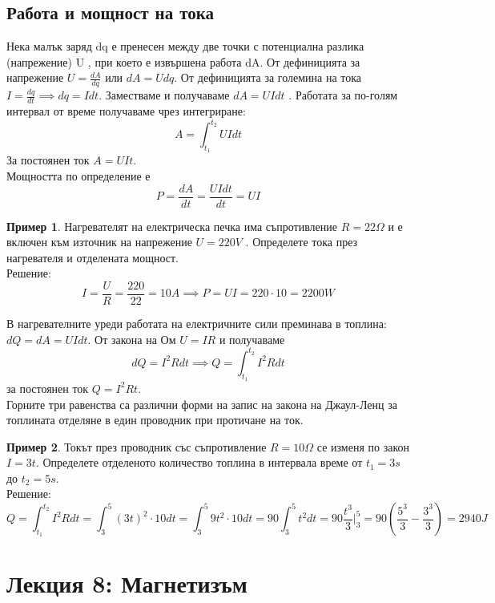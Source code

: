 \documentclass[fleqn, 12pt]{article}
\theoremstyle{definition}
\newtheorem{example}{Пример}[subsection]
\begin{document}
\subsection{Работа и мощност на тока}
Нека малък заряд dq е пренесен между две точки с потенциална разлика
(напрежение) U , при което е извършена работа dA. От дефиницията за
напрежение $U = \frac{dA}{dq}$ или $dA = Udq$. От дефиницията за големина на тока $I = \frac{dq}{dt} \implies dq = Idt$. Заместваме и получаваме $dA= U I dt$ . Работата за по-голям интервал от време
получаваме чрез интегриране:
$$A = \int_{t_1} ^{t_2} U I dt$$
За постоянен ток $A = UIt$. \\
Мощността по определение е
$$P = \frac{dA}{dt} = \frac{U I dt}{dt} = UI$$

\begin{example}
Нагревателят на електрическа печка има съпротивление $R = 22 \Omega$ и е
включен към източник на напрежение $U = 220 V$ . Определете тока през нагревателя
и отделената мощност.\\
Решение: 
$$I = \frac{U}{R} = \frac{220}{22} = 10A \implies P = UI = 220 \cdot 10 = 2200W$$
\end{example}

В нагревателните уреди работата на електричните сили преминава в топлина:
$dQ = dA = U I dt $. От закона на Ом $U = IR$ и получаваме
$$dQ = I^2 R dt \implies Q = \int_{t_1} ^{t_2} I^2 R dt$$
за постоянен ток $Q = I^2 R t$.\\
Горните три равенства са различни форми на запис на закона на Джаул-Ленц за
топлината отделяне в един проводник при протичане на ток.
 
\begin{example}
Токът през проводник със съпротивление $R = 10 \Omega$ се изменя по закон
$I = 3t$. Определете отделеното количество топлина в интервала време от $t_1 = 3s$  до
$t_2 = 5s$.\\
Решение: \\
$$Q = \int_{t_1} ^ {t_2} I^2 R dt =  \int_3 ^5 (3t)^2 \cdot 10 dt = \int_3 ^5 9t^2 \cdot 10 dt = 90 \int_3 ^5 t^2 dt = 90 \frac{t^3}{3} \Big| _3 ^ 5 = 90 \left( \frac{5^3}{3} - \frac{3^3}{3} \right) = 2940J$$

\end{example}


\newpage
\section{Лекция 8: Магнетизъм}
\end{document}
